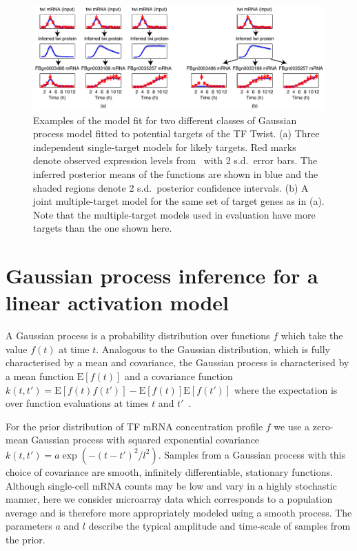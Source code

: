 \documentclass{pnastwo}
\begin{document}
\begin{article}
\begin{figure}[tb]
  \centering
  \includegraphics{fig1}
  \caption{Examples of the model fit for two different classes of 
    Gaussian process model fitted to potential targets of the TF Twist. (a) Three independent single-target models
    for likely targets. Red marks denote observed expression
    levels from~\cite{Tomancak2002} with 2 s.d.\ error bars.
    The inferred posterior means of the functions are shown in blue
    and the shaded regions denote 2 s.d.\ posterior confidence
    intervals. (b) A joint multiple-target model for
    the same set of target genes as in (a). Note that
    the multiple-target models used in evaluation have more targets
    than the one shown here.\label{fig:gpdisim_models}
}
\end{figure}

\section{Gaussian process inference for a linear activation model}

A Gaussian process is a probability distribution over
functions $f$ which take the value $f(t)$ at time
$t$. Analogous to the Gaussian distribution, which is fully
characterised by a mean and covariance, the Gaussian process is
characterised by a mean function $\mathrm{E}[f(t)]$ and a covariance
function $k(t,t')=\mathrm{E}[f(t)f(t')]-\mathrm{E}[f(t)]\mathrm{E}[f(t')]$
where the expectation is over function evaluations at times $t$ and
$t'$~\cite{Rasmussen2006}.

For the prior distribution of TF mRNA concentration profile $f$ we use a
zero-mean Gaussian process with squared exponential covariance
$k(t,t')=a\exp(-(t-t')^2/l^2)$. Samples from a Gaussian process with this choice
of covariance are smooth, infinitely differentiable, stationary functions. Although single-cell mRNA counts may be low
and vary in a highly stochastic manner, here we consider microarray data which
corresponds to a population average and is therefore more
appropriately modeled using a smooth process. The parameters $a$ and
$l$ describe the typical amplitude and time-scale of samples from
the prior. 


\end{article}
\end{document}
